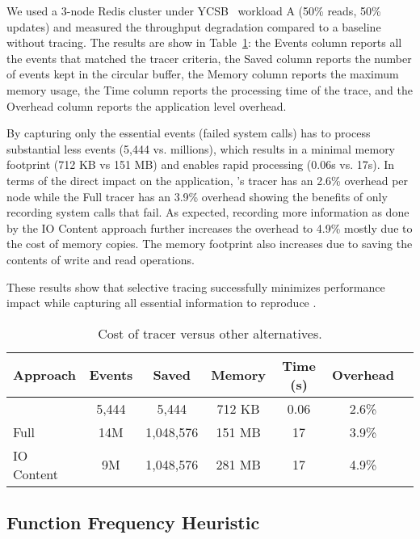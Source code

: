 We used a 3-node Redis cluster under YCSB~\cite{ycsb} workload A (50\% reads, 50\% updates) and measured the throughput degradation compared to a baseline without tracing.
The results are show in Table~\ref{tab:tracer_comparison}: the Events column reports all the events that matched the tracer criteria, the Saved column reports the number of events kept in the circular buffer, the Memory column reports the maximum memory usage, the Time column reports the processing time of the trace, and the Overhead column reports the application level overhead.

By capturing only the essential events (failed system calls) \sys has to process substantial less events (5,444 vs. millions), which results in a minimal memory footprint (712 KB vs 151 MB) and enables rapid processing (0.06s vs. 17s).
In terms of the direct impact on the application, \sys's tracer has an 2.6\% overhead per node while the Full tracer has an 3.9\% overhead showing the benefits of only recording system calls that fail.
As expected, recording more information as done by the IO Content approach further increases the overhead to 4.9\% mostly due to the cost of memory copies. The memory footprint also increases due to saving the contents of write and read operations.

These results show that \sys selective tracing successfully minimizes performance impact while capturing all essential information to reproduce \efib.

\begin{table}[h]
	\scriptsize
	\centering
	\caption{Cost of \sys tracer versus other alternatives.}
	\label{tab:tracer_comparison}
	\begin{tabular}{|l|c|c|c|c|c|c|}
		\hline
		\textbf{Approach} & \textbf{Events} & \textbf{Saved} & \textbf{Memory} & \textbf{Time (s)} & \textbf{Overhead} \\ \hline
		\sys              & 5,444           & 5,444          & 712 KB          & 0.06              & 2.6\%             \\ \hline
		Full              & 14M             & 1,048,576      & 151 MB          & 17                & 3.9\%             \\ \hline
		IO Content        & 9M              & 1,048,576      & 281 MB          & 17                & 4.9\%             \\ \hline
	\end{tabular}
\end{table}

\subsection{Function Frequency Heuristic}

